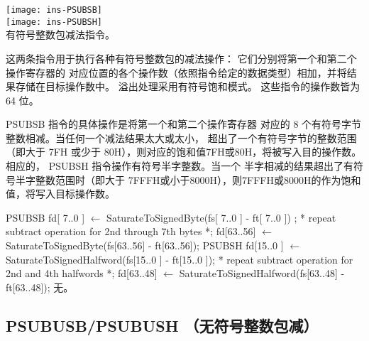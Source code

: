 \begin{instructionblk}
  \texttt{[image: ins-PSUBSB]} \\
  \texttt{[image: ins-PSUBSH]} \\
  {有符号整数包减法指令。}
  {这两条指令用于执行各种有符号整数包的减法操作： 它们分别将第一个和第二个操作寄存器的
  对应位置的各个操作数（依照指令给定的数据类型）相加，并将结果存储在目标操作数中。
  溢出处理采用有符号饱和模式。 这些指令的操作数皆为 64 位。

  PSUBSB 指令的具体操作是将第一个和第二个操作寄存器
  对应的 8 个有符号字节整数相减。当任何一个减法结果太大或太小，
  超出了一个有符号字节的整数范围（即大于 7FH 或少于
  80H），则对应的饱和值7FH或80H，将被写入目的操作数。
  相应的， PSUBSH 指令操作有符号半字整数。当一个
  半字相减的结果超出了有符号半字整数范围时（即大于
  7FFFH或小于8000H），则7FFFH或8000H的作为饱和值，将写入目标操作数。}
  {PSUBSB \narrownewline
  fd[ 7..0 ]  $\leftarrow$ SaturateToSignedByte(fs[ 7..0 ] - ft[ 7..0 ]) ; \narrownewline
  * repeat subtract operation for 2nd through 7th bytes *; \narrownewline
  fd[63..56] $\leftarrow$ SaturateToSignedByte(fs[63..56] - ft[63..56]); \narrownewline \narrownewline
  PSUBSH \narrownewline
  fd[15..0 ] $\leftarrow$ SaturateToSignedHalfword(fs[15..0 ] - ft[15..0 ]); \narrownewline
  * repeat subtract operation for 2nd and 4th halfwords *; \narrownewline
  fd[63..48] $\leftarrow$ SaturateToSignedHalfword(fs[63..48] - ft[63..48]);}
  {无。}
\end{instructionblk}

\subsection{PSUBUSB/PSUBUSH （无符号整数包减）}

